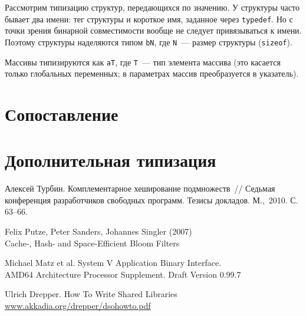 \documentclass[russian,a4paper,12pt]{article}
\begin{document}
Рассмотрим типизацию структур, передающихся по значению.  У структуры часто бывает
два имени: тег структуры и короткое имя, заданное через \verb|typedef|.  Но с точки
зрения бинарной совместимости вообще не следует привязываться к имени.  Поэтому
структуры наделяются типом \verb|bN|, где \verb|N|~--- размер структуры (\verb|sizeof|).

Массивы типизируются как \verb|aT|, где \verb|T|~--- тип элемента массива (это касается
только глобальных переменных; в параметрах массив преобразуется в указатель).

\section{Сопоставление}
\section{Дополнительная типизация}

\begin{thebibliography}{9}

Алексей Турбин.  Комплементарное хеширование подмножеств~//
Седьмая конференция разработчиков свободных программ.
Тезисы докладов. М.,~2010. С.\,63--66.

Felix Putze, Peter Sanders, Johannes Singler (2007)\\
Cache-, Hash- and Space-Efficient Bloom Filters

Michael Matz et al.  System V Application Binary Interface.\\
AMD64 Architecture Processor Supplement.  Draft Version 0.99.7

Ulrich Drepper. How To Write Shared Libraries\\
\url{www.akkadia.org/drepper/dsohowto.pdf}

\end{thebibliography}
\end{document}
